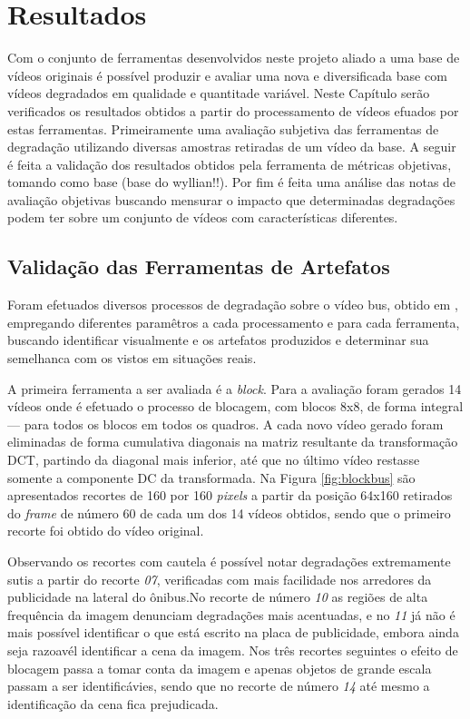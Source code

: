 
\chapter{Resultados} %

Com o conjunto de ferramentas desenvolvidos neste projeto aliado a uma base de vídeos originais é possível produzir e avaliar uma nova e diversificada base com vídeos degradados em qualidade e quantitade variável.
Neste Capítulo serão verificados os resultados obtidos a partir do processamento de vídeos efuados por estas ferramentas. Primeiramente uma avaliação subjetiva das ferramentas de degradação utilizando diversas amostras retiradas de um vídeo da base. A seguir é feita a validação dos resultados obtidos pela ferramenta de métricas objetivas, tomando como base (base do wyllian!!).
Por fim é feita uma análise das notas de avaliação objetivas buscando mensurar o impacto que determinadas degradações podem ter sobre um conjunto de vídeos com características diferentes.

\section{Validação das Ferramentas de Artefatos}

Foram efetuados diversos processos de degradação sobre o vídeo bus, obtido em \cite{tracevideoseq},  empregando diferentes paramêtros a cada processamento e para cada ferramenta, buscando identificar visualmente e os artefatos produzidos e determinar sua semelhanca com os vistos em situações reais.

A primeira ferramenta a ser avaliada é a \emph{block}.
Para a avaliação foram gerados 14 vídeos onde é efetuado o processo de blocagem, com blocos 8x8, de forma integral --- para todos os blocos em todos os quadros. A cada novo vídeo gerado foram eliminadas de forma cumulativa diagonais na matriz resultante da transformação DCT, partindo da diagonal mais inferior, até que no último vídeo restasse somente a componente DC da transformada. 
Na Figura \ref{fig:blockbus} são apresentados recortes de 160 por 160 \emph{pixels} a partir da posição 64x160 retirados do \emph{frame} de número 60 de cada um dos 14 vídeos obtidos, sendo que o primeiro recorte foi obtido do vídeo original.

Observando os recortes com cautela é possível notar degradações extremamente sutis a partir do recorte \emph{07}, verificadas com mais facilidade nos arredores da publicidade na lateral do ônibus.No recorte de número \emph{10} as regiões de alta frequência da imagem denunciam degradações mais acentuadas, e no \emph{11} já não é mais possível identificar o que está escrito na placa de publicidade, embora ainda seja razoavél identificar a cena da imagem.
Nos três recortes seguintes o efeito de blocagem passa a tomar conta da imagem e apenas objetos de grande escala passam a ser identificávies, sendo que no recorte de número \emph{14} até mesmo a identificação da cena fica prejudicada.

